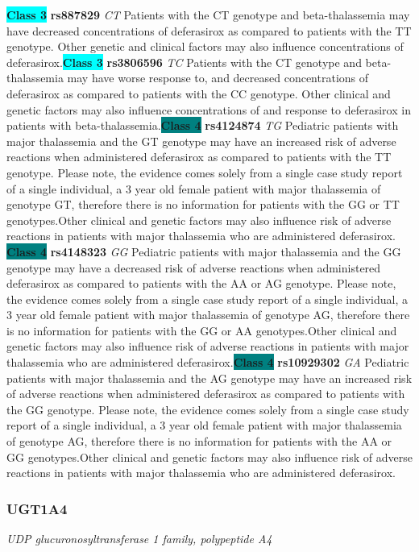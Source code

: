 \documentclass{report}
\begin{document}
\textbf{\colorbox{cyan} {Class 3}} \textbf{ rs887829 } \textit{ CT }
Patients with the CT genotype and beta-thalassemia may have decreased concentrations of deferasirox as compared to patients with the TT genotype. Other genetic and clinical factors may also influence concentrations of deferasirox.\newline\textbf{\colorbox{cyan} {Class 3}} \textbf{ rs3806596 } \textit{ TC }
Patients with the CT genotype and beta-thalassemia may have worse response to, and decreased concentrations of deferasirox as compared to patients with the CC genotype. Other clinical and genetic factors may also influence concentrations of and response to deferasirox in patients with beta-thalassemia.\newline\textbf{\colorbox{teal} {Class 4}} \textbf{ rs4124874 } \textit{ TG }
Pediatric patients with major thalassemia and the GT genotype may have an increased risk of adverse reactions when administered deferasirox as compared to patients with the TT genotype. Please note, the evidence comes solely from a single case study report of a single individual, a 3 year old female patient with major thalassemia of genotype GT, therefore there is no information for patients with the GG or TT genotypes.Other clinical and genetic factors may also influence risk of adverse reactions in patients with major thalassemia who are administered deferasirox. \newline\textbf{\colorbox{teal} {Class 4}} \textbf{ rs4148323 } \textit{ GG }
Pediatric patients with major thalassemia and the GG genotype may have a decreased risk of adverse reactions when administered deferasirox as compared to patients with the AA or AG genotype. Please note, the evidence comes solely from a single case study report of a single individual, a 3 year old female patient with major thalassemia of genotype AG, therefore there is no information for patients with the GG or AA genotypes.Other clinical and genetic factors may also influence risk of adverse reactions in patients with major thalassemia who are administered deferasirox.\newline\textbf{\colorbox{teal} {Class 4}} \textbf{ rs10929302 } \textit{ GA }
Pediatric patients with major thalassemia and the AG genotype may have an increased risk of adverse reactions when administered deferasirox as compared to patients with the GG genotype. Please note, the evidence comes solely from a single case study report of a single individual, a 3 year old female patient with major thalassemia of genotype AG, therefore there is no information for patients with the AA or GG genotypes.Other clinical and genetic factors may also influence risk of adverse reactions in patients with major thalassemia who are administered deferasirox.\newline\subsubsection{ UGT1A4 }
\textit{ UDP glucuronosyltransferase 1 family, polypeptide A4 }
\end{document}
